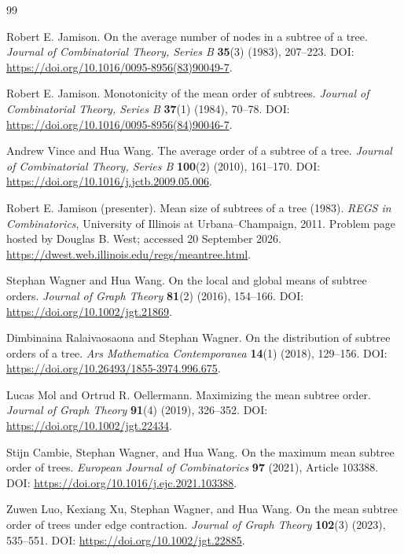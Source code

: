 \documentclass[11pt,reqno]{amsart}
\theoremstyle{plain}
\begin{document}
\clearpage
\begin{thebibliography}{99}
\small
\setlength{\itemsep}{0.65em}

Robert E. Jamison. On the average number of nodes in a subtree of a tree. \emph{Journal of Combinatorial Theory, Series B} \textbf{35}(3) (1983), 207--223.
\newblock DOI: \url{https://doi.org/10.1016/0095-8956(83)90049-7}.

Robert E. Jamison. Monotonicity of the mean order of subtrees. \emph{Journal of Combinatorial Theory, Series B} \textbf{37}(1) (1984), 70--78.
\newblock DOI: \url{https://doi.org/10.1016/0095-8956(84)90046-7}.

Andrew Vince and Hua Wang. The average order of a subtree of a tree. \emph{Journal of Combinatorial Theory, Series B} \textbf{100}(2) (2010), 161--170.
\newblock DOI: \url{https://doi.org/10.1016/j.jctb.2009.05.006}.

Robert E. Jamison (presenter). Mean size of subtrees of a tree (1983). \emph{REGS in Combinatorics}, University of Illinois at Urbana--Champaign, 2011. Problem page hosted by Douglas B. West; accessed 20 September 2026.
\newblock \url{https://dwest.web.illinois.edu/regs/meantree.html}.

Stephan Wagner and Hua Wang. On the local and global means of subtree orders. \emph{Journal of Graph Theory} \textbf{81}(2) (2016), 154--166.
\newblock DOI: \url{https://doi.org/10.1002/jgt.21869}.

Dimbinaina Ralaivaosaona and Stephan Wagner. On the distribution of subtree orders of a tree. \emph{Ars Mathematica Contemporanea} \textbf{14}(1) (2018), 129--156.
\newblock DOI: \url{https://doi.org/10.26493/1855-3974.996.675}.

Lucas Mol and Ortrud R. Oellermann. Maximizing the mean subtree order. \emph{Journal of Graph Theory} \textbf{91}(4) (2019), 326--352.
\newblock DOI: \url{https://doi.org/10.1002/jgt.22434}.

Stijn Cambie, Stephan Wagner, and Hua Wang. On the maximum mean subtree order of trees. \emph{European Journal of Combinatorics} \textbf{97} (2021), Article 103388.
\newblock DOI: \url{https://doi.org/10.1016/j.ejc.2021.103388}.

Zuwen Luo, Kexiang Xu, Stephan Wagner, and Hua Wang. On the mean subtree order of trees under edge contraction. \emph{Journal of Graph Theory} \textbf{102}(3) (2023), 535--551.
\newblock DOI: \url{https://doi.org/10.1002/jgt.22885}.


\end{thebibliography}
\end{document}
